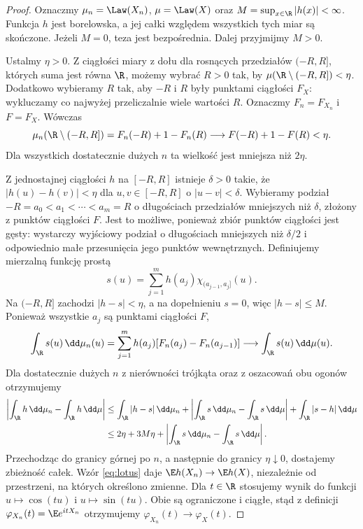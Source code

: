 \begin{proof}
Oznaczmy $\mu_n=\Law(X_n)$, $\mu=\Law(X)$
oraz $M=\sup_{x\in\R}|h(x)|<\infty$.
Funkcja $h$ jest borelowska, a jej całki względem
wszystkich tych miar są skończone. Jeżeli $M=0$,
teza jest bezpośrednia. Dalej przyjmijmy $M>0$.

Ustalmy $\eta>0$. Z ciągłości miary z dołu dla
rosnących przedziałów $(-R,R]$, których suma jest
równa $\R$, możemy wybrać $R>0$ tak, by
$\mu(\R\setminus(-R,R])<\eta$. Dodatkowo wybieramy
$R$ tak, aby $-R$ i $R$ były punktami ciągłości $F_X$:
wykluczamy co najwyżej przeliczalnie wiele wartości $R$.
Oznaczmy $F_n=F_{X_n}$ i $F=F_X$. Wówczas
\[
\mu_n(\R\setminus(-R,R])=F_n(-R)+1-F_n(R)
\longrightarrow F(-R)+1-F(R)<\eta.
\]
Dla wszystkich dostatecznie dużych $n$ ta wielkość
jest mniejsza niż $2\eta$.

Z jednostajnej ciągłości $h$ na $[-R,R]$ istnieje
$\delta>0$ takie, że $|h(u)-h(v)|<\eta$ dla
$u,v\in[-R,R]$ o $|u-v|<\delta$.
Wybieramy podział $-R=a_0<a_1<\cdots<a_m=R$
o długościach przedziałów mniejszych niż $\delta$,
złożony z punktów ciągłości $F$.
Jest to możliwe, ponieważ zbiór punktów ciągłości
jest gęsty: wystarczy wyjściowy podział o długościach
mniejszych niż $\delta/2$ i odpowiednio małe
przesunięcia jego punktów wewnętrznych.
Definiujemy mierzalną funkcję prostą
\[
s(u)=\sum_{j=1}^m h(a_j)\chi_{(a_{j-1},a_j]}(u).
\]
Na $(-R,R]$ zachodzi $|h-s|<\eta$, a na
dopełnieniu $s=0$, więc $|h-s|\leq M$.
Ponieważ wszystkie $a_j$ są punktami ciągłości $F$,
\[
\int_\R s(u)\,\dd\mu_n(u)
=\sum_{j=1}^m h(a_j)[F_n(a_j)-F_n(a_{j-1})]
\longrightarrow\int_\R s(u)\,\dd\mu(u).
\]
Dla dostatecznie dużych $n$ z nierówności trójkąta
oraz z oszacowań obu ogonów otrzymujemy
\[
\begin{aligned}
\left|\int_\R h\,\dd\mu_n-\int_\R h\,\dd\mu\right|
&\leq\int_\R|h-s|\,\dd\mu_n
+\left|\int_\R s\,\dd\mu_n-\int_\R s\,\dd\mu\right|
+\int_\R|s-h|\,\dd\mu\\
&\leq 2\eta+3M\eta+
\left|\int_\R s\,\dd\mu_n-\int_\R s\,\dd\mu\right|.
\end{aligned}
\]
Przechodząc do granicy górnej po $n$, a następnie
do granicy $\eta\downarrow0$, dostajemy zbieżność
całek. Wzór \eqref{eq:lotus} daje
$\E h(X_n)\to\E h(X)$, niezależnie od przestrzeni,
na których określono zmienne.
Dla $t\in\R$ stosujemy wynik do funkcji
$u\mapsto\cos(tu)$ i $u\mapsto\sin(tu)$.
Obie są ograniczone i ciągłe, stąd z definicji
$\varphi_{X_n}(t)=\E e^{itX_n}$ otrzymujemy
$\varphi_{X_n}(t)\to\varphi_X(t)$.
\end{proof}


